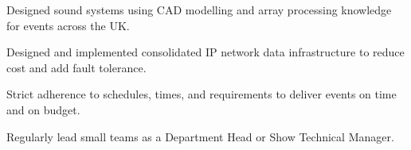\sectionsep
{}
\begin{tightemize}
  \item Designed sound systems using CAD modelling and array processing knowledge for events across the UK.
  \item Designed and implemented consolidated IP network data infrastructure to reduce cost and add fault tolerance.
  \item Strict adherence to schedules, times, and requirements to deliver events on time and on budget.
  \item Regularly lead small teams as a Department Head or Show Technical Manager.
\end{tightemize}
\sectionsep
